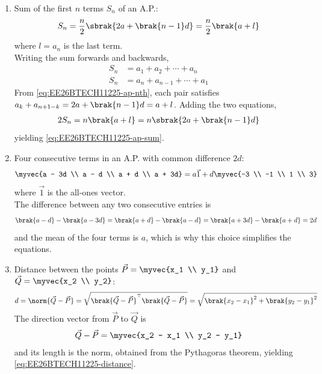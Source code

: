 \begin{enumerate}[label=\thesubsection.\arabic*, ref=\thesubsection.\theenumi]
\item Sum of the first $n$ terms $S_n$ of an A.P.:
\begin{align}
	S_n = \frac{n}{2}\sbrak{2a + \brak{n - 1}d} = \frac{n}{2}\brak{a + l}
	\label{eq:EE26BTECH11225-ap-sum}
\end{align}
where $l = a_n$ is the last term.
\\
\solution
Writing the sum forwards and backwards,
\begin{align}
	S_n &= a_1 + a_2 + \cdots + a_n
	\\
	S_n &= a_n + a_{n-1} + \cdots + a_1
\end{align}
From \eqref{eq:EE26BTECH11225-ap-nth}, each pair satisfies
$a_k + a_{n+1-k} = 2a + \brak{n-1}d = a + l$. Adding the two equations,
\begin{align}
	2S_n = n\brak{a + l} = n\sbrak{2a + \brak{n - 1}d}
\end{align}
yielding \eqref{eq:EE26BTECH11225-ap-sum}.

\item Four consecutive terms in an A.P. with common difference $2d$:
\begin{align}
	\myvec{a - 3d \\ a - d \\ a + d \\ a + 3d}
	= a\vec{1} + d\myvec{-3 \\ -1 \\ 1 \\ 3}
	\label{eq:EE26BTECH11225-ap-four}
\end{align}
where $\vec{1}$ is the all-ones vector.
\\
\solution
The difference between any two consecutive entries is
\begin{align}
	\brak{a - d} - \brak{a - 3d} = \brak{a + d} - \brak{a - d} = \brak{a + 3d} - \brak{a + d} = 2d
\end{align}
and the mean of the four terms is $a$, which is why this choice simplifies the equations.

\item Distance between the points $\vec{P} = \myvec{x_1 \\ y_1}$ and $\vec{Q} = \myvec{x_2 \\ y_2}$:
\begin{align}
	d = \norm{\vec{Q} - \vec{P}}
	= \sqrt{\brak{\vec{Q} - \vec{P}}^{\top}\brak{\vec{Q} - \vec{P}}}
	= \sqrt{\brak{x_2 - x_1}^2 + \brak{y_2 - y_1}^2}
	\label{eq:EE26BTECH11225-distance}
\end{align}
\solution
The direction vector from $\vec{P}$ to $\vec{Q}$ is
\begin{align}
	\vec{Q} - \vec{P} = \myvec{x_2 - x_1 \\ y_2 - y_1}
\end{align}
and its length is the norm, obtained from the Pythagoras theorem, yielding \eqref{eq:EE26BTECH11225-distance}.


\end{enumerate}
